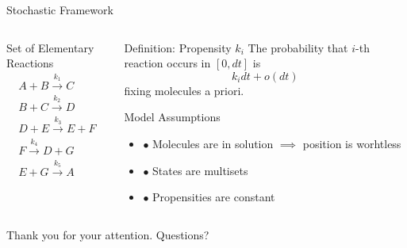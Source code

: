 \documentclass{beamer}
\begin{document}
\begin{frame}{Stochastic Framework}
  \begin{columns}
    \begin{column}{.45 \textwidth}
     \begin{block}{Set of Elementary Reactions}
      \begin{equation*}
        \begin{gathered}
          A + B \xrightarrow{k_1} C \\
          B + C \xrightarrow{k_2} D \\
          D + E \xrightarrow{k_3} E + F \\
          F \xrightarrow{k_4} D + G \\
          E + G \xrightarrow{k_5} A   
        \end{gathered}
      \end{equation*}
    \end{block}
    \end{column} 
    \begin{column}{.45 \textwidth}
      \begin{block}{Definition: Propensity $k_i$}
        The probability that $i$-th reaction occurs
         in  $[0, dt]$ is
         $$k_i dt + o(dt)$$
         fixing molecules a priori.
      \end{block}
      \begin{block}{Model Assumptions}
        \begin{itemize}
        \item $\bullet$ Molecules are in solution $\implies$ position is worhtless
        \item $\bullet$ States are multisets
        \item $\bullet$ Propensities are constant 
        \end{itemize}
      \end{block}
    \end{column}
  \end{columns}
\end{frame}

\begin{frame}
  
\end{frame}


\begin{frame}
  \begin{center}
  \Huge{Thank you for your attention.}
  \Huge{Questions?}
  \end{center}

\end{frame}
\end{document}
